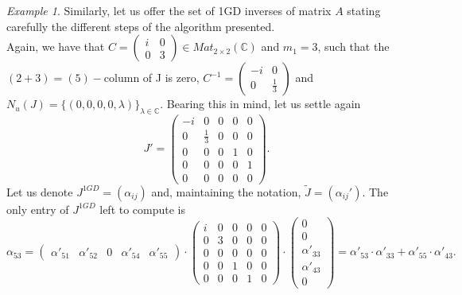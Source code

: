 \documentclass[10pt,a4paper]{amsart}
\theoremstyle{plain}
\theoremstyle{remark}
\newtheorem{exam}{Example}
\numberwithin{equation}{section} \numberwithin{defn}{section}
\begin{document}
\begin{exam}\label{Ex: Comp 1GD}
Similarly, let us offer the set of 1GD inverses of matrix $A$ stating carefully the different steps of the algorithm presented.\\
Again, we have that $C=\begin{pmatrix}
i & 0 \\
0 & 3
\end{pmatrix}\in Mat_{2 \times 2}(\mathbb{C})$ and $m_{1}=3$, such that the $(2+3)=(5)-$column of J is zero, $C^{-1}=\begin{pmatrix}
-i & 0 \\
0 & \frac{1}{3}
\end{pmatrix}$ and $N_u(J)=\{ ( 0,0,0,0,\lambda ) \}_{\lambda \in \mathbb{C}}.$  Bearing this in mind, let us settle again $$J'=\begin{pmatrix}
-i & 0 & 0 & 0 & 0 \\
0 & \frac{1}{3} & 0 & 0 & 0 \\
0 & 0 & 0 & 1 & 0 \\
0 & 0 & 0 & 0 & 1 \\
0 & 0 & 0 & 0 & 0
\end{pmatrix}.$$
 Let us denote $J^{1GD}=(\alpha_{ij})$ and, maintaining the notation, $\tilde{J}=(\alpha_{ij}').$ The only entry of $J^{1GD}$ left to compute is
$$\alpha_{53}=\begin{pmatrix}
\alpha'_{51} & \alpha'_{52} & 0 & \alpha'_{54} & \alpha'_{55}
\end{pmatrix}\cdot \begin{pmatrix}
i & 0 & 0 & 0 & 0 \\
0 & 3 & 0 & 0 & 0 \\
0 & 0 & 0 & 0 & 0 \\
0 & 0 & 1 & 0 & 0 \\
0 & 0 & 0 & 1 & 0
\end{pmatrix} \cdot \left(\begin{matrix}
0 \\
0 \\
\alpha'_{33} \\
\alpha'_{43} \\
0
\end{matrix}\right)=\alpha'_{53}\cdot \alpha'_{33}+\alpha'_{55}\cdot \alpha'_{43}.$$ 
 


\end{exam}
\end{document}
